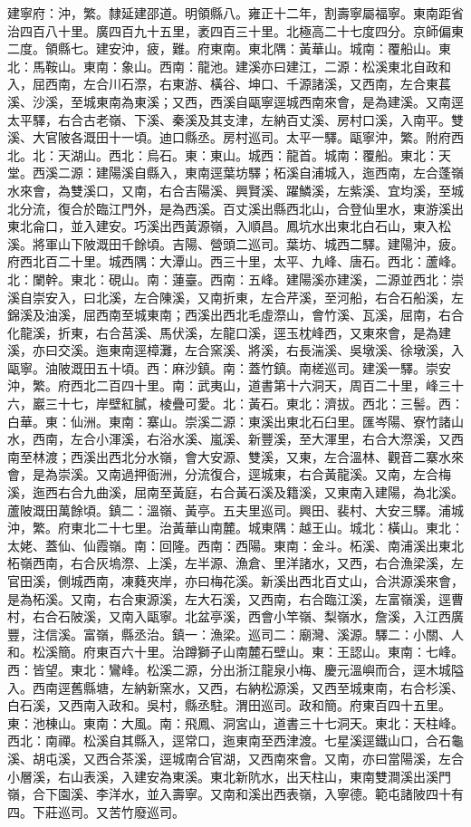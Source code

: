 \begin{pinyinscope}
建寧府：沖，繁。隸延建邵道。明領縣八。雍正十二年，割壽寧屬福寧。東南距省治四百八十里。廣四百九十五里，袤四百三十里。北極高二十七度四分。京師偏東二度。領縣七。建安沖，疲，難。府東南。東北隅：黃華山。城南：覆船山。東北：馬鞍山。東南：象山。西南：龍池。建溪亦曰建江，二源：松溪東北自政和入，屈西南，左合川石漈，右東游、橫谷、坤口、千源諸溪，又西南，左合東萇溪、沙溪，至城東南為東溪；又西，西溪自甌寧逕城西南來會，是為建溪。又南逕太平驛，右合古老嶺、下溪、秦溪及其支津，左納百丈溪、房村口溪，入南平。雙溪、大官陂各溉田十一頃。迪口縣丞。房村巡司。太平一驛。甌寧沖，繁。附府西北。北：天湖山。西北：烏石。東：東山。城西：龍首。城南：覆船。東北：天堂。西溪二源：建陽溪自縣入，東南逕葉坊驛；柘溪自浦城入，迤西南，左合蓬嶺水來會，為雙溪口，又南，右合吉陽溪、興賢溪、躍鱗溪，左紫溪、宜均溪，至城北分流，復合於臨江門外，是為西溪。百丈溪出縣西北山，合登仙里水，東游溪出東北侖口，並入建安。巧溪出西黃源嶺，入順昌。鳳坑水出東北白石山，東入松溪。將軍山下陂溉田千餘頃。吉陽、營頭二巡司。葉坊、城西二驛。建陽沖，疲。府西北百二十里。城西隅：大潭山。西三十里，太平、九峰、唐石。西北：蘆峰。北：闌幹。東北：硯山。南：蓮臺。西南：五峰。建陽溪亦建溪，二源並西北：崇溪自崇安入，曰北溪，左合陳溪，又南折東，左合芹溪，至河船，右合石船溪，左錦溪及油溪，屈西南至城東南；西溪出西北毛虛漈山，會竹溪、瓦溪，屈南，右合化龍溪，折東，右合莒溪、馬伏溪，左龍口溪，逕玉枕峰西，又東來會，是為建溪，亦曰交溪。迤東南逕樟灘，左合窯溪、將溪，右長湍溪、吳墩溪、徐墩溪，入甌寧。油陂溉田五十頃。西：麻沙鎮。南：蓋竹鎮。南槎巡司。建溪一驛。崇安沖，繁。府西北二百四十里。南：武夷山，道書第十六洞天，周百二十里，峰三十六，巖三十七，岸壁紅膩，棱疊可愛。北：黃石。東北：濟拔。西北：三髻。西：白華。東：仙洲。東南：寨山。崇溪二源：東溪出東北石臼里。匯岑陽、寮竹諸山水，西南，左合小渾溪，右浴水溪、嵐溪、新豐溪，至大渾里，右合大漈溪，又西南至林渡；西溪出西北分水嶺，會大安源、雙溪，又東，左合溫林、觀音二寨水來會，是為崇溪。又南過押衙洲，分流復合，逕城東，右合黃龍溪。又南，左合梅溪，迤西右合九曲溪，屈南至黃庭，右合黃石溪及籍溪，又東南入建陽，為北溪。蘆陂溉田萬餘頃。鎮二：溫嶺、黃亭。五夫里巡司。興田、裴村、大安三驛。浦城沖，繁。府東北二十七里。治黃華山南麓。城東隅：越王山。城北：橫山。東北：太姥、蓋仙、仙霞嶺。南：回隆。西南：西陽。東南：金斗。柘溪、南浦溪出東北柘嶺西南，右合灰塢漈、上溪，左半源、漁倉、里洋諸水，又西，右合漁梁溪，左官田溪，側城西南，凍蕤夾岸，亦曰梅花溪。新溪出西北百丈山，合洪源溪來會，是為柘溪。又南，右合東源溪，左大石溪，又西南，右合臨江溪，左富嶺溪，逕曹村，右合石陂溪，又南入甌寧。北盆亭溪，西會小竿嶺、梨嶺水，詹溪，入江西廣豐，注信溪。富嶺，縣丞治。鎮一：漁梁。巡司二：廟灣、溪源。驛二：小關、人和。松溪簡。府東百六十里。治蹲獅子山南麓石壁山。東：王認山。東南：七峰。西：皆望。東北：鸞峰。松溪二源，分出浙江龍泉小梅、慶元溫嶼而合，逕木城隘入。西南逕舊縣塘，左納新窯水，又西，右納松源溪，又西至城東南，右合杉溪、白石溪，又西南入政和。吳村，縣丞駐。渭田巡司。政和簡。府東百四十五里。東：池棟山。東南：大風。南：飛鳳、洞宮山，道書三十七洞天。東北：天柱峰。西北：南禪。松溪自其縣入，逕常口，迤東南至西津渡。七星溪逕鐵山口，合石龜溪、胡屯溪，又西合茶溪，逕城南合官湖，又西南來會。又南，亦曰當陽溪，左合小層溪，右山表溪，入建安為東溪。東北新阬水，出天柱山，東南雙澗溪出溪門嶺，合下園溪、李洋水，並入壽寧。又南和溪出西表嶺，入寧德。範屯諸陂四十有四。下莊巡司。又苦竹廢巡司。


\end{pinyinscope}
